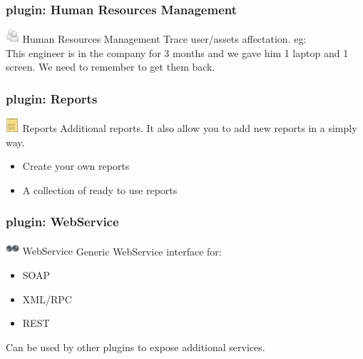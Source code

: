 \documentclass{beamer}
\begin{document}
\begin{frame}
    \frametitle{plugin: Human Resources Management}
    
    \begin{block}{\includegraphics[height=0.5cm]{./pics/plugins/human.jpg} Human Resources Management}
        Trace user/assets affectation. eg: \\ 
        \small{This engineer is in the company for 3 months and we gave him 1 laptop and 1 screen. We need to remember to get them back.}
    \end{block}

\end{frame}


\begin{frame}
    \frametitle{plugin: Reports}
    
    \begin{block}{\includegraphics[height=0.5cm]{./pics/plugins/reports.jpg} Reports}
        Additional reports. It also allow you to add new reports in a simply way.
        \begin{itemize}
            \item Create your own reports
            \item A collection of ready to use reports
        \end{itemize}
    \end{block}

\end{frame}

\begin{frame}
    \frametitle{plugin: WebService}
    
    \begin{block}{\includegraphics[height=0.5cm]{./pics/plugins/webservice.jpg} WebService}
        Generic WebService interface for:
        \begin{itemize}
            \item SOAP 
            \item XML/RPC
            \item REST
        \end{itemize}
        Can be used by other plugins to expose additional services.
    \end{block}

\end{frame}
\end{document}
